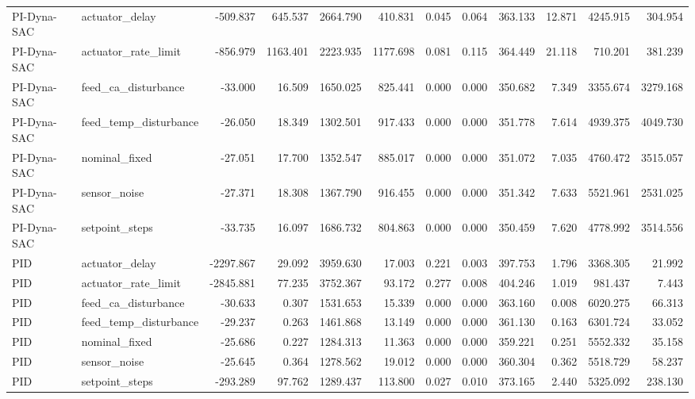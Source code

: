 \begin{tabular}{llrrrrrrrrrr}
PI-Dyna-SAC & actuator\_delay & -509.837 & 645.537 & 2664.790 & 410.831 & 0.045 & 0.064 & 363.133 & 12.871 & 4245.915 & 304.954 \\
PI-Dyna-SAC & actuator\_rate\_limit & -856.979 & 1163.401 & 2223.935 & 1177.698 & 0.081 & 0.115 & 364.449 & 21.118 & 710.201 & 381.239 \\
PI-Dyna-SAC & feed\_ca\_disturbance & -33.000 & 16.509 & 1650.025 & 825.441 & 0.000 & 0.000 & 350.682 & 7.349 & 3355.674 & 3279.168 \\
PI-Dyna-SAC & feed\_temp\_disturbance & -26.050 & 18.349 & 1302.501 & 917.433 & 0.000 & 0.000 & 351.778 & 7.614 & 4939.375 & 4049.730 \\
PI-Dyna-SAC & nominal\_fixed & -27.051 & 17.700 & 1352.547 & 885.017 & 0.000 & 0.000 & 351.072 & 7.035 & 4760.472 & 3515.057 \\
PI-Dyna-SAC & sensor\_noise & -27.371 & 18.308 & 1367.790 & 916.455 & 0.000 & 0.000 & 351.342 & 7.633 & 5521.961 & 2531.025 \\
PI-Dyna-SAC & setpoint\_steps & -33.735 & 16.097 & 1686.732 & 804.863 & 0.000 & 0.000 & 350.459 & 7.620 & 4778.992 & 3514.556 \\
PID & actuator\_delay & -2297.867 & 29.092 & 3959.630 & 17.003 & 0.221 & 0.003 & 397.753 & 1.796 & 3368.305 & 21.992 \\
PID & actuator\_rate\_limit & -2845.881 & 77.235 & 3752.367 & 93.172 & 0.277 & 0.008 & 404.246 & 1.019 & 981.437 & 7.443 \\
PID & feed\_ca\_disturbance & -30.633 & 0.307 & 1531.653 & 15.339 & 0.000 & 0.000 & 363.160 & 0.008 & 6020.275 & 66.313 \\
PID & feed\_temp\_disturbance & -29.237 & 0.263 & 1461.868 & 13.149 & 0.000 & 0.000 & 361.130 & 0.163 & 6301.724 & 33.052 \\
PID & nominal\_fixed & -25.686 & 0.227 & 1284.313 & 11.363 & 0.000 & 0.000 & 359.221 & 0.251 & 5552.332 & 35.158 \\
PID & sensor\_noise & -25.645 & 0.364 & 1278.562 & 19.012 & 0.000 & 0.000 & 360.304 & 0.362 & 5518.729 & 58.237 \\
PID & setpoint\_steps & -293.289 & 97.762 & 1289.437 & 113.800 & 0.027 & 0.010 & 373.165 & 2.440 & 5325.092 & 238.130 \\
\bottomrule
\end{tabular}
